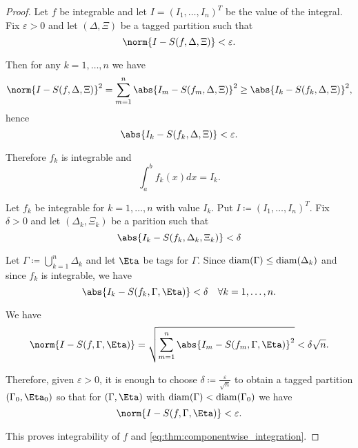 \begin{proof}
  \SufficiencySubProof Let \( f \) be integrable and let \( I = (I_1, \ldots, I_n)^T \) be the value of the integral. Fix \( \varepsilon > 0 \) and let \( (\Delta, \Xi) \) be a tagged partition such that
  \begin{equation*}
    \norm{I - S(f, \Delta, \Xi)} < \varepsilon.
  \end{equation*}

  Then for any \( k = 1, \ldots, n \) we have
  \begin{equation*}
    \norm{I - S(f, \Delta, \Xi)}^2
    =
    \sum_{m=1}^n \abs{I_m - S(f_m, \Delta, \Xi)}^2
    \geq
    \abs{I_k - S(f_k, \Delta, \Xi)}^2,
  \end{equation*}
  hence
  \begin{equation*}
    \abs{I_k - S(f_k, \Delta, \Xi)} < \varepsilon.
  \end{equation*}

  Therefore \( f_k \) is integrable and
  \begin{equation*}
    \int_a^b f_k(x) dx = I_k.
  \end{equation*}

  \NecessitySubProof Let \( f_k \) be integrable for \( k = 1, \ldots, n \) with value \( I_k \). Put \( I \coloneqq (I_1, \ldots, I_n)^T \). Fix \( \delta > 0 \) and let \( (\Delta_k, \Xi_k) \) be a parition such that
  \begin{equation*}
    \abs{I_k - S(f_k, \Delta_k, \Xi_k)} < \delta
  \end{equation*}

  Let \( \Gamma \coloneqq \bigcup_{k=1}^n \Delta_k \) and let \( \Eta \) be tags for \( \Gamma \). Since \( \operatorname{diam}(\Gamma) \leq \operatorname{diam}(\Delta_k) \) and since \( f_k \) is integrable, we have
  \begin{equation*}
    \abs{I_k - S(f_k, \Gamma, \Eta)} < \delta \quad\forall k = 1, \ldots, n.
  \end{equation*}

  We have
  \begin{equation*}
    \norm{I - S(f, \Gamma, \Eta)}
    =
    \sqrt{\sum_{m=1}^n \abs{I_m - S(f_m, \Gamma, \Eta)}^2}
    <
    \delta \sqrt{n}.
  \end{equation*}

  Therefore, given \( \varepsilon > 0 \), it is enough to choose \( \delta \coloneqq \frac {\varepsilon} {\sqrt n} \) to obtain a tagged partition \( (\Gamma_0, \Eta_0) \) so that for \( (\Gamma, \Eta) \) with \( \operatorname{diam}(\Gamma) < \operatorname{diam}(\Gamma_0) \) we have
  \begin{equation*}
    \norm{I - S(f, \Gamma, \Eta)} < \varepsilon.
  \end{equation*}

  This proves integrability of \( f \) and \eqref{eq:thm:componentwise_integration}.
\end{proof}
